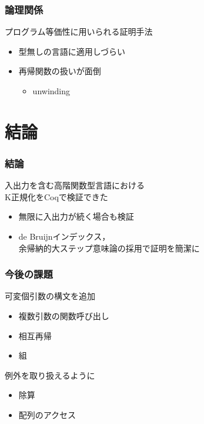 \documentclass[dvipdfmx,cjk,xcolor=dvipsnames,envcountsect,notheorems,12pt]{beamer}
\theoremstyle{definition}
\begin{document}
\begin{frame}
	\frametitle{論理関係}
	\Large プログラム等価性に用いられる証明手法
	\begin{itemize}
		\item 型無しの言語に適用しづらい
		\item 再帰関数の扱いが面倒
			\begin{itemize}
				\item unwinding
			\end{itemize}
	\end{itemize}
\end{frame}

\section{結論}

\begin{frame}
	\frametitle{結論}
	\LARGE 入出力を含む高階関数型言語における\\
	K正規化をCoqで検証できた
	\begin{itemize}
		\item 無限に入出力が続く場合も検証
		\item de Bruijnインデックス，\\
			余帰納的大ステップ意味論の採用で証明を簡潔に
	\end{itemize}
\end{frame}

\begin{frame}
	\frametitle{今後の課題}
	\LARGE 可変個引数の構文を追加
	\begin{itemize}
		\item 複数引数の関数呼び出し
		\item 相互再帰
		\item 組
	\end{itemize}

	\vfill

	例外を取り扱えるように
	\begin{itemize}
		\item 除算
		\item 配列のアクセス
	\end{itemize}
\end{frame}
\end{document}
